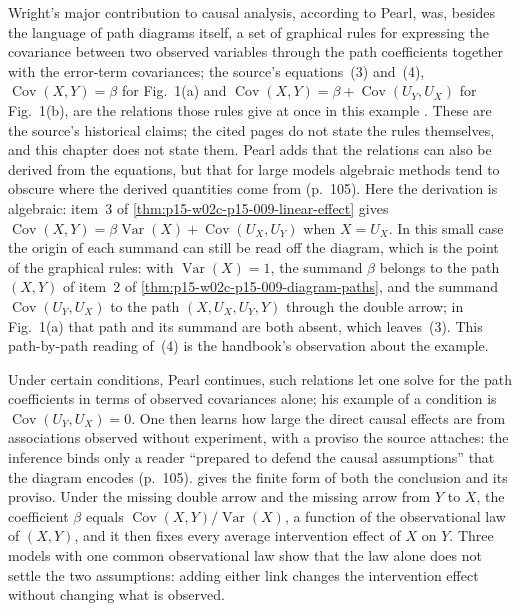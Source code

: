 Wright's major contribution to causal analysis, according to Pearl, was,
besides the language of path diagrams itself, a set of graphical rules
for expressing the covariance between two observed variables through the
path coefficients together with the error-term covariances; the source's
equations~(3) and~(4), \(\operatorname{Cov}(X,Y)=\beta\) for Fig.~1(a)
and \(\operatorname{Cov}(X,Y)=\beta+\operatorname{Cov}(U_Y,U_X)\) for
Fig.~1(b), are the relations those rules give at once in this example
\cite[sec.~3.1, p.~105]{Pearl2009CausalOverview}. These are the
source's historical claims; the cited pages do not state the rules
themselves, and this chapter does not state them. Pearl adds that the
relations can also be derived from the equations, but that for large
models algebraic methods tend to obscure where the derived quantities come
from (p.~105). Here the derivation is algebraic: item~3 of
\cref{thm:p15-w02c-p15-009-linear-effect} gives
\(\operatorname{Cov}(X,Y)=\beta\operatorname{Var}(X)
+\operatorname{Cov}(U_X,U_Y)\) when \(X=U_X\). In this small case the
origin of each summand can still be read off the diagram, which is the
point of the graphical rules: with \(\operatorname{Var}(X)=1\), the
summand \(\beta\) belongs to the path \((X,Y)\) of item~2 of
\cref{thm:p15-w02c-p15-009-diagram-paths}, and the summand
\(\operatorname{Cov}(U_Y,U_X)\) to the path \((X,U_X,U_Y,Y)\) through
the double arrow; in Fig.~1(a) that path and its summand are both
absent, which leaves~(3). This path-by-path reading of~(4) is the
handbook's observation about the example.

Under certain conditions, Pearl continues, such relations let one solve
for the path coefficients in terms of observed covariances alone; his
example of a condition is \(\operatorname{Cov}(U_Y,U_X)=0\). One then
learns how large the direct causal effects are from associations observed
without experiment, with a proviso the source attaches: the inference
binds only a reader ``prepared to defend the causal assumptions'' that the
diagram encodes (p.~105).  gives the finite form
of both the conclusion and its proviso. Under the missing double arrow
and the missing arrow from \(Y\) to \(X\), the coefficient \(\beta\)
equals \(\operatorname{Cov}(X,Y)/\operatorname{Var}(X)\), a function
of the observational law of \((X,Y)\), and it then fixes every average
intervention effect of \(X\) on \(Y\). Three models with one common
observational law show that the law alone does not settle the two
assumptions: adding either link changes the intervention effect without
changing what is observed.

